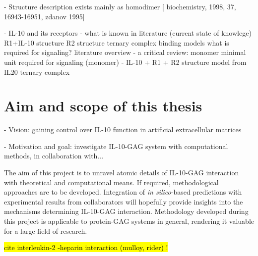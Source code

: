     - Structure description
        exists mainly as homodimer [
            biochemistry, 1998, 37, 16943-16951, zdanov 1995]


    - IL-10 and its receptors
        - what is known in literature (current state of knowlege)
            R1+IL-10 structure
            R2 structure
            ternary complex binding models
            what is required for signaling? literature overview
        - a critical review: monomer
            minimal unit required for signaling (monomer)
        - IL-10 + R1 + R2 structure model from IL20 ternary complex


\section{Aim and scope of this thesis}

- Vision: gaining control over IL-10 function in artificial extracellular matrices

- Motivation and goal: investigate IL-10-GAG system with computational
      methods, in collaboration with...

The aim of this project is to unravel atomic details of IL-10-GAG interaction
with theoretical and computational means. If required, methodological approaches
are to be developed. Integration of \textit{in silico}-based predictions with
experimental results from collaborators will hopefully provide insights into the
mechanisms determining IL-10-GAG interaction. Methodology developed during this
project is applicable to protein-GAG systems in general, rendering it valuable
for a large field of research.



\hl{cite interleukin-2 -heparin interaction (mulloy, rider) !}

\lipsum[1-5]





